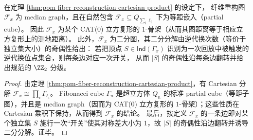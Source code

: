 \begin{corollary}\label{cor:pom-fiber-reconstruction-median-partialcube-cat0}
在定理 \ref{thm:pom-fiber-reconstruction-cartesian-product} 的设定下，
纤维重构图 \(\mathcal F_x\) 为 median graph，且在自然包含
\(
\mathcal F_x\subseteq Q_{\sum_i \ell_i}
\)
下为等距嵌入（partial cube）。
因此 \(\mathcal F_x\) 为某个 CAT(0) 立方复形的 \(1\)-骨架（从而其图距离等于相应立方复形上的测地距离）。
此外，\(\mathcal F_x\) 为二分图，其二分分解由逆代换次数（等价于独立集大小）的奇偶性给出：
若把顶点 \(S\in\mathsf{Ind}(\Gamma_x)\) 识别为一次回放中被触发的逆代换位点集合，则每条边对应一次开关，
从而 \(|S|\) 的奇偶性沿每条边翻转并给出规范的 \(\ZZ_2\) 分级。
\end{corollary}
\begin{proof}
由定理 \ref{thm:pom-fiber-reconstruction-cartesian-product}，有 Cartesian 分解 \(\mathcal F_x\cong \prod_i \Gamma_{\ell_i}\)。
Fibonacci cube \(\Gamma_n\) 是超立方体 \(Q_n\) 的标准 partial cube（等距子图），并且是 median graph（因而为 CAT(0) 立方复形的 \(1\)-骨架）；这些性质在 Cartesian 乘积下保持，从而得到 \(\mathcal F_x\) 的结论。
最后，按定义 \(\mathcal F_x\) 的一条边即对某个独立集 \(S\) 施行一次“开关”使其对称差大小为 \(1\)，故 \(|S|\) 的奇偶性沿边翻转并诱导二分分解。证毕。
\end{proof}


